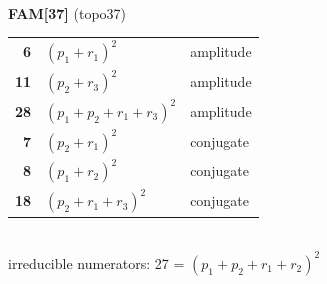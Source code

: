 \documentclass[10pt]{article}
\begin{document}
\begin{minipage}[t]{0.48\textwidth}
{}\\[2mm]\textbf{FAM[37]} (topo37)\\[2pt]{\footnotesize\begin{tabular}{@{}r@{\ \ }l@{\ \ }l@{}}\textbf{6} & $(p_1+r_1)^2$ & amplitude\\
\textbf{11} & $(p_2+r_3)^2$ & amplitude\\
\textbf{28} & $(p_1+p_2+r_1+r_3)^2$ & amplitude\\
\textbf{7} & $(p_2+r_1)^2$ & conjugate\\
\textbf{8} & $(p_1+r_2)^2$ & conjugate\\
\textbf{18} & $(p_2+r_1+r_3)^2$ & conjugate\\\end{tabular}}\\[2pt]{\scriptsize irreducible numerators: 27 = $(p_1+p_2+r_1+r_2)^2$}\end{minipage}\hfill%
\end{document}
